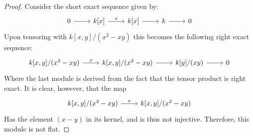 \documentclass{article}
\begin{document}
\begin{proof}
  Consider the short exact sequence given by:
  \[
  \begin{tikzcd}
    0 \arrow[r] & k[x] \arrow[r,"x"] & k[x] \arrow[r] & k \arrow[r] & 0
  \end{tikzcd}
\]
Upon tensoring with $k[x,y]/(x^{2}-xy)$ this becomes the following right exact sequence:
  \[
  \begin{tikzcd}
     k[x,y]/(x^{2}-xy) \arrow[r,"x"] & k[x,y]/(x^{2}-xy) \arrow[r] & k[y]/(xy) \arrow[r] & 0
  \end{tikzcd}
\]
Where the last module is derived from the fact that the tensor product is right exact. It is clear, however, that the map
 \[
  \begin{tikzcd}
     k[x,y]/(x^{2}-xy) \arrow[r,"x"] & k[x,y]/(x^{2}-xy)
  \end{tikzcd}
\]
Has the element $(x - y)$ in its kernel, and is thus not injective. Therefore, this module is not flat.
\end{proof}
\end{document}
